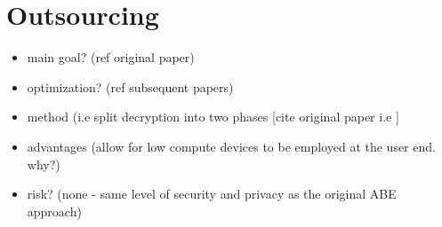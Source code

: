 


\section{Outsourcing}

\begin{itemize}
	\item main goal? (ref original paper\cite{Green2011outsource})
	\item optimization? (ref subsequent papers)
	\item method (i.e split decryption into two phases [cite original paper i.e \cite{Green2011outsource}]
	\item advantages (allow for low compute devices to be employed at the user end. why?)
	\item risk? (none - same level of security and privacy as the original ABE approach)
\end{itemize}

